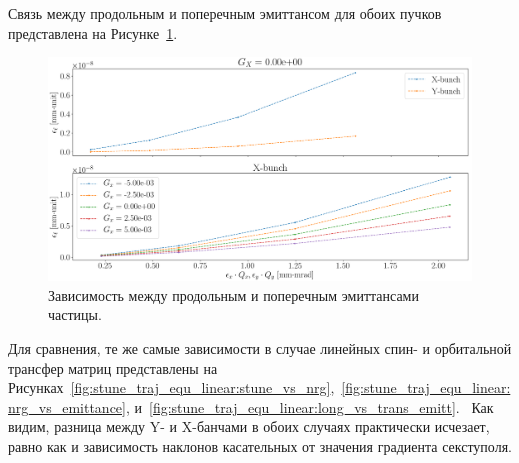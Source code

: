 Связь между продольным и поперечным эмиттансом для обоих пучков представлена на Рисунке~\ref{fig:long_emitt_vs_trans_emitt}.

\begin{figure}[h]
	\centering
	\includegraphics[height=.3\paperheight]{images/stune_traj_equ/long_emitt_vs_trans_emitt}
	\caption{Зависимость между продольным и поперечным эмиттансами частицы.\label{fig:long_emitt_vs_trans_emitt}}
\end{figure}

Для сравнения, те же самые зависимости в случае линейных спин- и орбитальной трансфер матриц представлены на Рисунках~\ref{fig:stune_traj_equ_linear:stune_vs_nrg},~\ref{fig:stune_traj_equ_linear:nrg_vs_emittance}, и~\ref{fig:stune_traj_equ_linear:long_vs_trans_emitt}.  Как видим, разница между Y- и X-банчами в обоих случаях практически исчезает, равно как и зависимость наклонов касательных от значения градиента секступоля.

